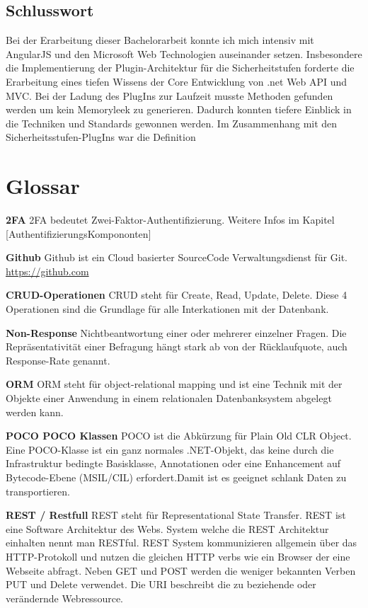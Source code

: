 \newpage

\section{Schlusswort}\label{schlusswort}

Bei der Erarbeitung dieser Bachelorarbeit konnte ich mich intensiv mit
AngularJS und den Microsoft Web Technologien auseinander setzen.
Insbesondere die Implementierung der Plugin-Architektur für die
Sicherheitstufen forderte die Erarbeitung eines tiefen Wissens der Core
Entwicklung von .net Web API und MVC. Bei der Ladung des PlugIns zur
Laufzeit musste Methoden gefunden werden um kein Memoryleek zu
generieren. Dadurch konnten tiefere Einblick in die Techniken und
Standards gewonnen werden. Im Zusammenhang mit den
Sicherheitsstufen-PlugIns war die Definition

\newpage

\appendix

\hypertarget{glossar}{\chapter{Glossar}\label{glossar}}

\textbf{2FA} 2FA bedeutet Zwei-Faktor-Authentifizierung. Weitere Infos
im Kapitel {[}AuthentifizierungsKompononten{]}

\textbf{Github} Github ist ein Cloud basierter SourceCode
Verwaltungsdienst für Git. \url{https://github.com}

\textbf{CRUD-Operationen} CRUD steht für Create, Read, Update, Delete.
Diese 4 Operationen sind die Grundlage für alle Interkationen mit der
Datenbank.

\textbf{Non-Response} Nichtbeantwortung einer oder mehrerer einzelner
Fragen. Die Repräsentativität einer Befragung hängt stark ab von der
Rücklaufquote, auch Response-Rate genannt.

\textbf{ORM} ORM steht für object-relational mapping und ist eine
Technik mit der Objekte einer Anwendung in einem relationalen
Datenbanksystem abgelegt werden kann.

\textbf{POCO POCO Klassen} POCO ist die Abkürzung für Plain Old CLR
Object. Eine POCO-Klasse ist ein ganz normales .NET-Objekt, das keine
durch die Infrastruktur bedingte Basisklasse, Annotationen oder eine
Enhancement auf Bytecode-Ebene (MSIL/CIL) erfordert.Damit ist es
geeignet schlank Daten zu transportieren.

\textbf{REST / Restfull} REST steht für Representational State Transfer.
REST ist eine Software Architektur des Webs. System welche die REST
Architektur einhalten nennt man RESTful. REST System kommunizieren
allgemein über das HTTP-Protokoll und nutzen die gleichen HTTP verbs wie
ein Browser der eine Webseite abfragt. Neben GET und POST werden die
weniger bekannten Verben PUT und Delete verwendet. Die URI beschreibt
die zu beziehende oder verändernde Webressource.

